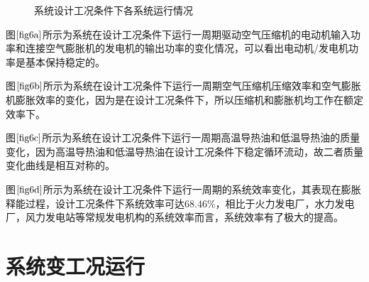 \documentclass{jnuthesis}
\begin{document}
\begin{figure}[h]
{\begin{minipage}{0.5\linewidth}
				\label{fig6c}   %
			\end{minipage}
		}
		\caption{\fontsize{10.5bp}{10pt}系统设计工况条件下各系统运行情况} %
		\label{fig:6}  %
	\end{figure}
	
	\par 图$ \fontsize{10.5bp}{10pt}\ref{fig6a} $所示为系统在设计工况条件下运行一周期驱动空气压缩机的电动机输入功率和连接空气膨胀机的发电机的输出功率的变化情况，可以看出电动机/发电机功率是基本保持稳定的。
	\par 图$ \fontsize{10.5bp}{10pt}\ref{fig6b} $所示为系统在设计工况条件下运行一周期空气压缩机压缩效率和空气膨胀机膨胀效率的变化，因为是在设计工况条件下，所以压缩机和膨胀机均工作在额定效率下。
	\par 图$ \fontsize{10.5bp}{10pt}\ref{fig6c} $所示为系统在设计工况条件下运行一周期高温导热油和低温导热油的质量变化，因为高温导热油和低温导热油在设计工况条件下稳定循环流动，故二者质量变化曲线是相互对称的。
	\par 图$ \fontsize{10.5bp}{10pt}\ref{fig6d} $所示为系统在设计工况条件下运行一周期的系统效率变化，其表现在膨胀释能过程，设计工况条件下系统效率可达$ 68.46\% $，相比于火力发电厂，水力发电厂，风力发电站等常规发电机构的系统效率而言，系统效率有了极大的提高。
	
	\section{系统变工况运行}
\end{document}
